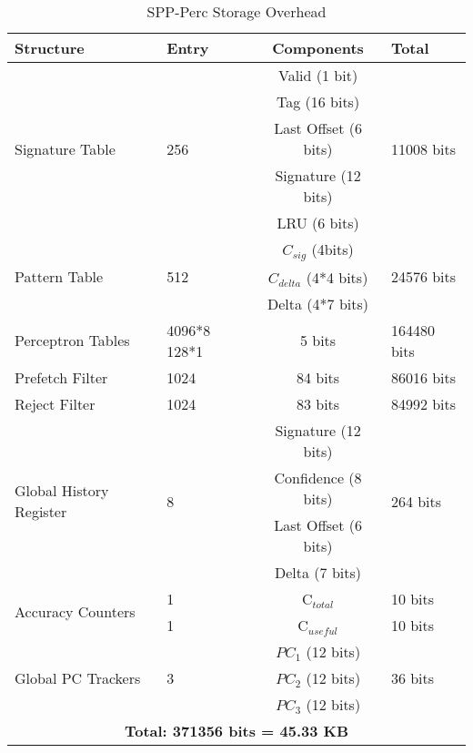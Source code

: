 \documentclass{sig-alternate}
\begin{document}
\begin{table}[]
    \centering
    \begin{tabular}{|p{1.5cm}|p{1cm}|c|p{1.5cm}|}
    \hline
        \textbf{Structure} &
        \textbf{Entry} &
        \textbf{Components} &
        \textbf{Total} \\
    \hline
        \multirow{5}{1.5cm}{Signature Table} & \multirow{5}{1.5cm}{256} & Valid (1 bit) & \multirow{5}{1cm}{11008  bits}\\
        & & Tag (16 bits) &\\
        & & Last Offset (6 bits) &\\  
        & & Signature (12 bits) &\\
        & & LRU (6 bits) &\\
    \hline
        \multirow{3}{1.5cm}{Pattern Table} & \multirow{3}{1.5cm}{512} & $C_{sig}$ (4bits) &\multirow{3}{1cm}{24576 bits}\\
        & & $C_{delta}$ (4*4 bits) &\\
        & & Delta (4*7 bits) &\\
    \hline
        \multirow{3}{1.5cm}{Perceptron Tables} & \multirow{3}{1.5cm}{4096*8 128*1} & \multirow{3}{1.5cm}{5 bits} & \multirow{3}{1.5cm}{164480 bits}\\
        & & &\\
        & & &\\
    \hline
        \multirow{2}{1.5cm}{Prefetch Filter \footnotemark[1]} & \multirow{2}{1.5cm}{1024} & \multirow{2}{1.5cm}{84 bits} & \multirow{2}{1.5cm}{86016 bits}\\
        & & &\\
    \hline
     \multirow{2}{1.5cm}{Reject Filter \footnotemark[2]} & \multirow{2}{1.5cm}{1024} & \multirow{2}{1.5cm}{83 bits} & \multirow{2}{1.5cm}{84992 bits}\\
        & & &\\
    \hline
        \multirow{4}{1.5cm}{Global History Register} & \multirow{4}{1.5cm}{8} & Signature (12 bits) & \multirow{4}{1.5cm}{264 bits}\\
        & & Confidence (8 bits) & \\
        & & Last Offset (6 bits) & \\
        & & Delta (7 bits) & \\
    \hline
        \multirow{2}{1.5cm}{Accuracy Counters} & 1 & C$_{total}$ & 10 bits\\
        & 1 & C$_{useful}$ & 10 bits\\
    \hline
        \multirow{3}{1.5cm}{Global PC Trackers} & \multirow{3}{1cm}{3} & $PC_1$ (12 bits)& \multirow{3}{1.cm}{36 bits}\\
        & & $PC_2$ (12 bits) &\\
        & & $PC_3$ (12 bits) &\\
    \hline
        \multicolumn{4}{|c|}{\textbf{Total: 371356 bits = 45.33 KB}}\\
    \hline
    \end{tabular}
    \caption{SPP-Perc Storage Overhead}
    \label{tab:SPPPerc_overhead}
\end{table}
\end{document}
